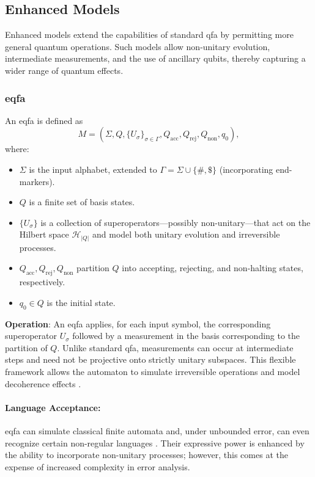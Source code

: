 \subsection{Enhanced Models}
\label{subsec:enhanced-models}

Enhanced models extend the capabilities of standard \gls{qfa} by permitting more general quantum operations. Such models allow non-unitary evolution, intermediate measurements, and the use of ancillary qubits, thereby capturing a wider range of quantum effects.

\subsubsection{\acrfull{eqfa}}
\label{sssec:eqfa}
\begin{definition}
An \gls{eqfa} is defined as 
\[
M = (\Sigma, Q, \{U_\sigma\}_{\sigma\in\Gamma}, Q_{\text{acc}}, Q_{\text{rej}}, Q_{\text{non}}, q_0),
\]
where:
\begin{itemize}
    \item \( \Sigma \) is the input alphabet, extended to \(\Gamma = \Sigma \cup \{ \#, \$\}\) (incorporating end-markers).
    \item \( Q \) is a finite set of basis states.
    \item \( \{U_\sigma\} \) is a collection of superoperators—possibly non-unitary—that act on the Hilbert space \(\mathcal{H}_{|Q|}\) and model both unitary evolution and irreversible processes.
    \item \( Q_{\text{acc}}, Q_{\text{rej}}, Q_{\text{non}} \) partition \( Q \) into accepting, rejecting, and non-halting states, respectively.
    \item \( q_0 \in Q \) is the initial state.
\end{itemize}
\end{definition}

\textbf{Operation}:  
An \gls{eqfa} applies, for each input symbol, the corresponding superoperator \( U_\sigma \) followed by a measurement in the basis corresponding to the partition of \( Q \). Unlike standard \gls{qfa}, measurements can occur at intermediate steps and need not be projective onto strictly unitary subspaces. This flexible framework allows the automaton to simulate irreversible operations and model decoherence effects \cite{paschen2000quantum}.

\paragraph{Language Acceptance:}  
\gls{eqfa} can simulate classical finite automata and, under unbounded error, can even recognize certain non-regular languages \cite{nayak1999optimal}. Their expressive power is enhanced by the ability to incorporate non-unitary processes; however, this comes at the expense of increased complexity in error analysis.

